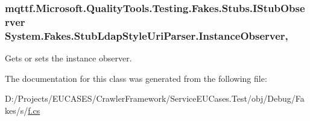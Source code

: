 \hypertarget{class_system_1_1_fakes_1_1_stub_ldap_style_uri_parser_a3b55435f597e90ef08b795e53cf701a2}{
\subsubsection[{Instance\-Observer}]{\setlength{\rightskip}{0pt plus 5cm}mqttf.\-Microsoft.\-Quality\-Tools.\-Testing.\-Fakes.\-Stubs.\-I\-Stub\-Observer System.\-Fakes.\-Stub\-Ldap\-Style\-Uri\-Parser.\-Instance\-Observer\hspace{0.3cm}{\ttfamily [get]}, {\ttfamily [set]}}}\label{class_system_1_1_fakes_1_1_stub_ldap_style_uri_parser_a3b55435f597e90ef08b795e53cf701a2}


Gets or sets the instance observer.



The documentation for this class was generated from the following file\-:\begin{DoxyCompactItemize}
\item 
D\-:/\-Projects/\-E\-U\-C\-A\-S\-E\-S/\-Crawler\-Framework/\-Service\-E\-U\-Cases.\-Test/obj/\-Debug/\-Fakes/s/\hyperlink{s_2f_8cs}{f.\-cs}\end{DoxyCompactItemize}
